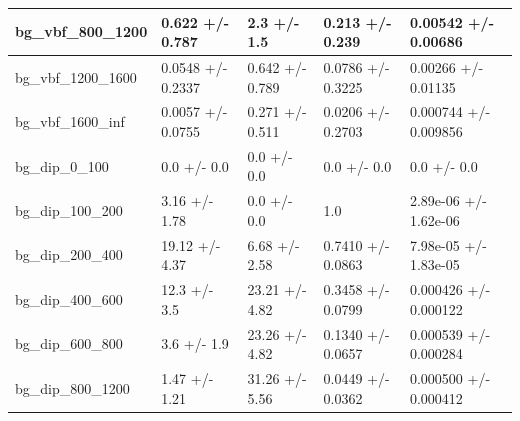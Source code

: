 \documentclass[a4paper, 10pt]{article}
\begin{document}
\begin{table}[H]
\begin{center}
\begin{tabular}{|m{20.0mm}|m{27.0mm}|m{27.0mm}|m{33.0mm}|m{32.0mm}|}
      \hline
      {\cellcolor{white}         bg\_vbf\_800\_1200}& {\cellcolor{white}         0.622 +/\-- 0.787}& {\cellcolor{white}         2.3 +/\-- 1.5}& {\cellcolor{white}         0.213 +/\-- 0.239}& {\cellcolor{white}         0.00542 +/\-- 0.00686}\\
      \hline
      {\cellcolor{white}         bg\_vbf\_1200\_1600}& {\cellcolor{white}         0.0548 +/\-- 0.2337}& {\cellcolor{white}         0.642 +/\-- 0.789}& {\cellcolor{white}         0.0786 +/\-- 0.3225}& {\cellcolor{white}         0.00266 +/\-- 0.01135}\\
      \hline
      {\cellcolor{white}         bg\_vbf\_1600\_inf}& {\cellcolor{white}         0.0057 +/\-- 0.0755}& {\cellcolor{white}         0.271 +/\-- 0.511}& {\cellcolor{white}         0.0206 +/\-- 0.2703}& {\cellcolor{white}         0.000744 +/\-- 0.009856}\\
      \hline
      {\cellcolor{white}         bg\_dip\_0\_100}& {\cellcolor{white}         0.0 +/\-- 0.0}& {\cellcolor{white}         0.0 +/\-- 0.0}& {\cellcolor{white}         0.0 +/\-- 0.0}& {\cellcolor{white}         0.0 +/\-- 0.0}\\
      \hline
      {\cellcolor{white}         bg\_dip\_100\_200}& {\cellcolor{white}         3.16 +/\-- 1.78}& {\cellcolor{white}         0.0 +/\-- 0.0}& {\cellcolor{white}         1.0}& {\cellcolor{white}         2.89e-06 +/\-- 1.62e-06}\\
      \hline
      {\cellcolor{white}         bg\_dip\_200\_400}& {\cellcolor{white}         19.12 +/\-- 4.37}& {\cellcolor{white}         6.68 +/\-- 2.58}& {\cellcolor{white}         0.7410 +/\-- 0.0863}& {\cellcolor{white}         7.98e-05 +/\-- 1.83e-05}\\
      \hline
      {\cellcolor{white}         bg\_dip\_400\_600}& {\cellcolor{white}         12.3 +/\-- 3.5}& {\cellcolor{white}         23.21 +/\-- 4.82}& {\cellcolor{white}         0.3458 +/\-- 0.0799}& {\cellcolor{white}         0.000426 +/\-- 0.000122}\\
      \hline
      {\cellcolor{white}         bg\_dip\_600\_800}& {\cellcolor{white}         3.6 +/\-- 1.9}& {\cellcolor{white}         23.26 +/\-- 4.82}& {\cellcolor{white}         0.1340 +/\-- 0.0657}& {\cellcolor{white}         0.000539 +/\-- 0.000284}\\
      \hline
      {\cellcolor{white}         bg\_dip\_800\_1200}& {\cellcolor{white}         1.47 +/\-- 1.21}& {\cellcolor{white}         31.26 +/\-- 5.56}& {\cellcolor{white}         0.0449 +/\-- 0.0362}& {\cellcolor{white}         0.000500 +/\-- 0.000412}\\

\end{tabular}
\end{center}
\end{table}
\end{document}
